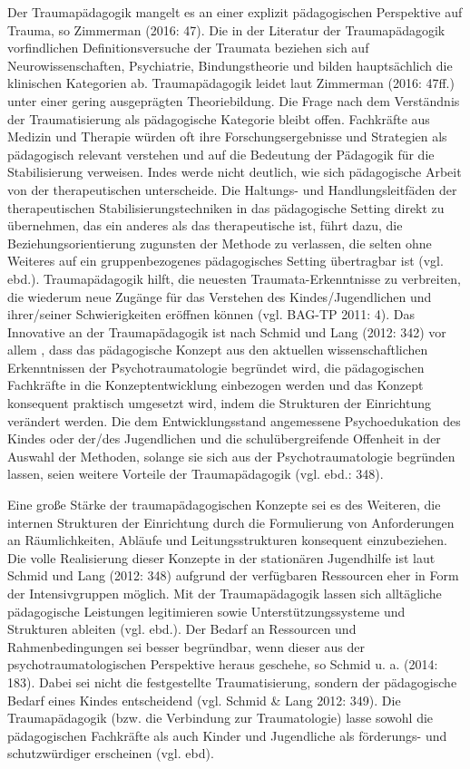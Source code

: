 Der Traumapädagogik mangelt es an einer explizit pädagogischen Perspektive auf Trauma, so Zimmerman (2016: 47). Die in der Literatur der Traumapädagogik vorfindlichen Definitionsversuche der Traumata beziehen sich auf Neurowissenschaften, Psychiatrie, Bindungstheorie und bilden hauptsächlich die klinischen Kategorien ab. Traumap{\"a}dagogik leidet laut Zimmerman (2016: 47ff.) unter einer gering ausgeprägten Theoriebildung. Die Frage nach dem Verständnis der Traumatisierung als pädagogische Kategorie bleibt offen. Fachkräfte aus Medizin und Therapie würden oft ihre Forschungsergebnisse und Strategien als pädagogisch relevant verstehen und auf die Bedeutung der Pädagogik für die Stabilisierung verweisen. Indes werde nicht deutlich, wie sich pädagogische Arbeit von der therapeutischen unterscheide. Die Haltungs- und Handlungsleitfäden der therapeutischen Stabilisierungstechniken in das pädagogische Setting direkt zu übernehmen, das ein anderes als das therapeutische ist, führt dazu, die Beziehungsorientierung zugunsten der Methode zu verlassen, die selten ohne Weiteres auf ein gruppenbezogenes pädagogisches Setting übertragbar ist (vgl. ebd.). Traumapädagogik hilft, die neuesten Traumata-Erkenntnisse zu verbreiten, die wiederum neue Zugänge für das Verstehen des Kindes/Jugendlichen und ihrer/seiner Schwierigkeiten eröffnen können (vgl. BAG-TP 2011: 4).  
Das Innovative an der Traumap{\"a}dagogik ist nach Schmid und Lang (2012: 342) vor allem , dass das pädagogische Konzept aus den aktuellen wissenschaftlichen Erkenntnissen der Psychotraumatologie begründet wird, die pädagogischen Fachkräfte in die Konzeptentwicklung einbezogen werden und das Konzept konsequent praktisch umgesetzt wird, indem die Strukturen der Einrichtung verändert werden. Die dem Entwicklungsstand angemessene Psychoedukation des Kindes oder der/des Jugendlichen und die schulübergreifende Offenheit in der Auswahl der Methoden, solange sie sich aus der Psychotraumatologie begründen lassen, seien weitere Vorteile der Traumapädagogik (vgl. ebd.: 348).

Eine große Stärke der traumapädagogischen Konzepte sei es des Weiteren, die internen Strukturen der Einrichtung durch die Formulierung von Anforderungen an Räumlichkeiten, Abläufe und Leitungsstrukturen konsequent einzubeziehen. Die volle Realisierung dieser Konzepte in der stationären Jugendhilfe ist laut Schmid und Lang (2012: 348) aufgrund der verfügbaren Ressourcen eher in Form der Intensivgruppen möglich. Mit der Traumapädagogik lassen sich alltägliche pädagogische Leistungen legitimieren sowie Unterstützungssysteme und Strukturen ableiten (vgl. ebd.). Der Bedarf an Ressourcen und Rahmenbedingungen sei besser begründbar, wenn dieser aus der psychotraumatologischen Perspektive heraus geschehe, so Schmid u. a. (2014: 183). Dabei sei nicht die festgestellte Traumatisierung, sondern der p{\"a}dagogische Bedarf eines Kindes entscheidend (vgl. Schmid \& Lang 2012: 349). Die Traumapädagogik (bzw. die Verbindung zur Traumatologie) lasse sowohl die pädagogischen Fachkräfte als auch Kinder und Jugendliche als förderungs- und schutzwürdiger erscheinen (vgl. ebd).

